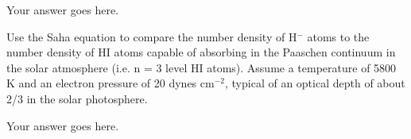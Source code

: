 \documentclass[12pt]{article}
\newenvironment{problem}[2][Problem]{\begin{trivlist}
\item[\hskip \labelsep {\bfseries #1}\hskip \labelsep {\bfseries #2.}]}{\end{trivlist}}
\newenvironment{answer}[2][Answer]{\begin{trivlist}
\item[\hskip \labelsep {\bfseries #1}\hskip \labelsep {\bfseries #2.}]}{\end{trivlist}}
\begin{document}
\begin{answer}{3}
Your answer goes here. 
\end{answer}

\begin{problem}{4}
Use the Saha equation to compare the number density of H$^-$ atoms to the number density of HI atoms capable of absorbing in the Paaschen continuum in the solar atmosphere (i.e. n = 3 level HI atoms). Assume a temperature of 5800 K and an electron pressure of 20 dynes cm$^{-2}$, typical of an optical depth of about 2/3 in the solar photosphere.
\end{problem}

\begin{answer}{4}
Your answer goes here. 
\end{answer}
 
\end{document}
